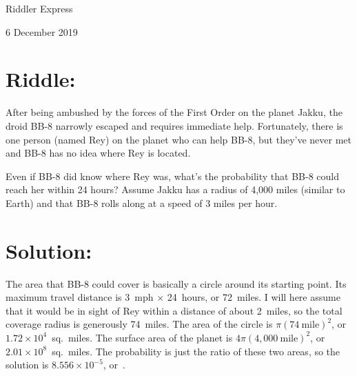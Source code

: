 \documentclass{article}
\begin{document}
\pagestyle{empty} %


\begin{center}
{\LARGE Riddler Express}

\vspace{0.15in}

{\Large 6 December 2019}
\end{center}


\section*{Riddle:}

After being ambushed by the forces of the First Order on the planet Jakku, the droid BB-8 narrowly escaped and requires immediate help.
Fortunately, there is one person (named Rey) on the planet who can help BB-8, but they’ve never met and BB-8 has no idea where Rey is located.

Even if BB-8 did know where Rey was, what’s the probability that BB-8 could reach her within 24 hours?
Assume Jakku has a radius of 4,000 miles (similar to Earth) and that BB-8 rolls along at a speed of 3 miles per hour.



\section*{Solution:}

The area that BB-8 could cover is basically a circle around its starting point.
Its maximum travel distance is 3~mph $\times$ 24~hours, or 72~miles.
I will here assume that it would be in sight of Rey within a distance of about 2~miles, so the total coverage radius is generously 74~miles.
The area of the circle is $\pi(74~\mathrm{mile})^{2}$, or $1.72\times10^{4}$~sq.~miles.
The surface area of the planet is $4\pi(4,000~\mathrm{mile})^{2}$, or $2.01\times10^{8}$~sq.~miles.
The probability is just the ratio of these two areas, so the solution is $8.556\times10^{-5}$, or
\,.
\end{document}
